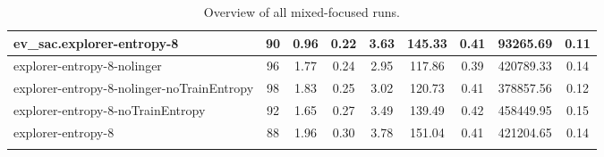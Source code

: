 \begin{sidewaystable}
\begin{longtable}{|l|c|c|c|c|c|c|c|c|}
ev_sac.explorer-entropy-8 & 90 & {\cellcolor[HTML]{A7D1C9}} \color[HTML]{000000} 0.96 & {\cellcolor[HTML]{95C9BE}} \color[HTML]{000000} 0.22 & {\cellcolor[HTML]{A8D2C9}} \color[HTML]{000000} 3.63 & {\cellcolor[HTML]{AED5CD}} \color[HTML]{000000} 145.33 & 0.41 & 93265.69 & {\cellcolor[HTML]{EBF2F0}} \color[HTML]{000000} 0.11 \\ \hline
explorer-entropy-8-nolinger & 96 & {\cellcolor[HTML]{64B1A2}} \color[HTML]{F1F1F1} 1.77 & {\cellcolor[HTML]{84C1B4}} \color[HTML]{000000} 0.24 & {\cellcolor[HTML]{B5D8D1}} \color[HTML]{000000} 2.95 & {\cellcolor[HTML]{BADAD4}} \color[HTML]{000000} 117.86 & 0.39 & 420789.33 & {\cellcolor[HTML]{AAD3CA}} \color[HTML]{000000} 0.14 \\ \hline
explorer-entropy-8-nolinger-noTrainEntropy & 98 & {\cellcolor[HTML]{60AF9F}} \color[HTML]{F1F1F1} 1.83 & {\cellcolor[HTML]{7FBEB1}} \color[HTML]{000000} 0.25 & {\cellcolor[HTML]{B4D8D0}} \color[HTML]{000000} 3.02 & {\cellcolor[HTML]{B8DAD3}} \color[HTML]{000000} 120.73 & 0.41 & 378857.56 & {\cellcolor[HTML]{EBF2F0}} \color[HTML]{000000} 0.12 \\ \hline
explorer-entropy-8-noTrainEntropy & 92 & {\cellcolor[HTML]{6EB6A7}} \color[HTML]{F1F1F1} 1.65 & {\cellcolor[HTML]{6FB6A8}} \color[HTML]{F1F1F1} 0.27 & {\cellcolor[HTML]{ABD3CB}} \color[HTML]{000000} 3.49 & {\cellcolor[HTML]{B1D6CE}} \color[HTML]{000000} 139.49 & 0.42 & 458449.95 & {\cellcolor[HTML]{6AB4A5}} \color[HTML]{F1F1F1} 0.15 \\ \hline
explorer-entropy-8 & 88 & {\cellcolor[HTML]{55AA99}} \color[HTML]{F1F1F1} 1.96 & {\cellcolor[HTML]{55AA99}} \color[HTML]{F1F1F1} 0.30 & {\cellcolor[HTML]{A5D1C8}} \color[HTML]{000000} 3.78 & {\cellcolor[HTML]{ACD4CC}} \color[HTML]{000000} 151.04 & 0.41 & 421204.65 & {\cellcolor[HTML]{A8D2C9}} \color[HTML]{000000} 0.14 \\ \hline
    
        \caption{Overview of all mixed-focused runs. \label{tab:RQ1-results-mixedFocusedRuns}}
    \end{longtable}

\end{sidewaystable}